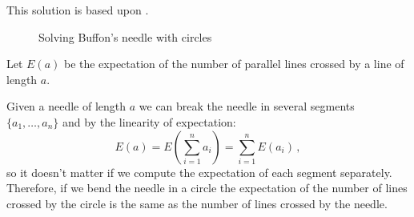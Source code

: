 
This solution is based upon \cite[Chapter~26]{proofs}.

\begin{figure}[tb]
\begin{center}
\end{center}
\caption{Solving Buffon's needle with circles}\label{f.buffon3}
\end{figure}

Let $E(a)$ be the expectation of the number of parallel lines crossed by a line of length $a$.

Given a needle of length $a$ we can break the needle in several segments $\{a_1,\ldots,a_n\}$ and by the linearity of expectation:
\[
E(a) = E\left(\sum_{i=1}^{n} a_i\right) = \sum_{i=1}^{n} E(a_i)\,, 
\]
so it doesn't matter if we compute the expectation of each segment separately. Therefore, if we bend the needle in a circle the expectation of the number of lines crossed by the circle is the same as the number of lines crossed by the needle.

